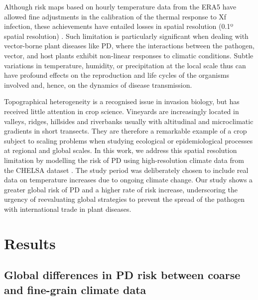 Although risk maps based on hourly temperature data from the ERA5 have
allowed fine adjustments in the calibration of the thermal response to Xf
infection, these achievements have entailed losses in spatial resolution (0.1º
spatial resolution) \cite{GimenezRomero2022_CommsBio, munoz2019era5land}. Such
limitation is particularly significant when dealing with vector-borne plant
diseases like PD, where the interactions between the pathogen, vector, and host
plants exhibit non-linear responses to climatic conditions. Subtle variations
in temperature, humidity, or precipitation at the local scale thus can have
profound effects on the reproduction and life cycles of the organisms involved
and, hence, on the dynamics of disease transmission.

Topographical heterogeneity is a recognised issue in invasion biology, but
has received little attention in crop science.	Vineyards are increasingly
located in valleys, ridges, hillsides and riverbanks usually with altitudinal
and microclimatic gradients in short transects.  They are therefore a
remarkable example of  a crop subject to scaling problems when studying
ecological or epidemiological processes at  regional and global scales.  In
this work, we address this spatial resolution limitation by modelling the risk
of PD  using high-resolution climate data from the CHELSA dataset
\cite{Karger2017}. The study period was deliberately chosen  to include real
data on temperature increases due to ongoing climate change.  Our study shows a
greater global risk of PD and a higher rate of risk increase, underscoring the
urgency of reevaluating global strategies to prevent the spread of the pathogen
with international trade in plant diseases.

\section{Results}

\subsection{Global differences in  PD risk between coarse and fine-grain
    climate data}

